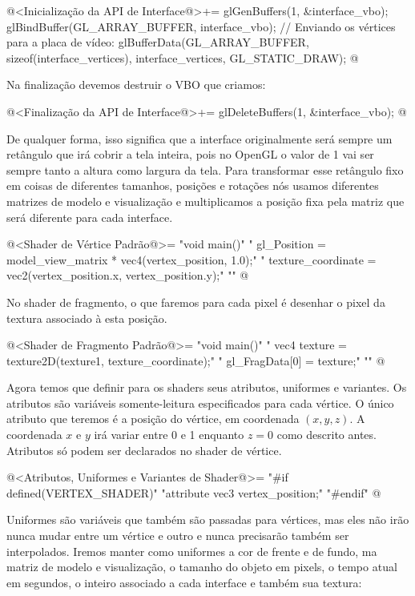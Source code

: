 \iniciocodigo
@<Inicialização da API de Interface@>+=
glGenBuffers(1, &interface_vbo);
glBindBuffer(GL_ARRAY_BUFFER, interface_vbo);
// Enviando os vértices para a placa de vídeo:
glBufferData(GL_ARRAY_BUFFER, sizeof(interface_vertices), interface_vertices,
             GL_STATIC_DRAW);
@
\fimcodigo

Na finalização devemos destruir o VBO que criamos:

\iniciocodigo
@<Finalização da API de Interface@>+=
glDeleteBuffers(1, &interface_vbo);
@
\fimcodigo

De qualquer forma, isso significa que a interface originalmente será
sempre um retângulo que irá cobrir a tela inteira, pois no OpenGL o
valor de 1 vai ser sempre tanto a altura como largura da tela.  Para
transformar esse retângulo fixo em coisas de diferentes tamanhos,
posições e rotações nós usamos diferentes matrizes de modelo e
visualização e multiplicamos a posição fixa pela matriz que será
diferente para cada interface.

\iniciocodigo
@<Shader de Vértice Padrão@>=
"void main(){\n"
"  gl_Position = model_view_matrix * vec4(vertex_position, 1.0);\n"
"  texture_coordinate = vec2(vertex_position.x, vertex_position.y);\n"
"}\n"
@
\fimcodigo

No shader de fragmento, o que faremos para cada pixel é desenhar o
pixel da textura associado à esta posição.

\iniciocodigo
@<Shader de Fragmento Padrão@>=
"void main(){\n"
"  vec4 texture = texture2D(texture1, texture_coordinate);\n"
"  gl_FragData[0] = texture;\n"
"}\n"
@
\fimcodigo

Agora temos que definir para os shaders seus atributos, uniformes e
variantes. Os atributos são variáveis somente-leitura especificados
para cada vértice. O único atributo que teremos é a posição do
vértice, em coordenada $(x, y, z)$. A coordenada $x$ e $y$ irá variar
entre 0 e 1 enquanto $z=0$ como descrito antes. Atributos só podem ser
declarados no shader de vértice.

\iniciocodigo
@<Atributos, Uniformes e Variantes de Shader@>=
"#if defined(VERTEX_SHADER)\n"
"attribute vec3 vertex_position;\n"
"#endif\n"
@
\fimcodigo

Uniformes são variáveis que também são passadas para vértices, mas
eles não irão nunca mudar entre um vértice e outro e nunca precisarão
também ser interpolados. Iremos manter como uniformes a cor de frente
e de fundo, ma matriz de modelo e visualização, o tamanho do objeto em
pixels, o tempo atual em segundos, o inteiro associado a cada
interface e também sua textura:

